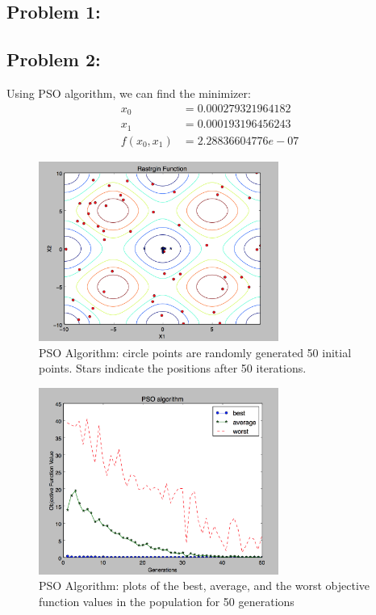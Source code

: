 \documentclass{article}
\begin{document}
 


\subsection*{{Problem 1: }}



\subsection*{{Problem 2: }}

Using PSO algorithm, we can find the minimizer: \\
\begin{align*}
x_0 & = 0.000279321964182 \\
x_1 & = 0.000193196456243 \\
f(x_0,x_1) & =  2.28836604776e-07
\end{align*}

\begin{figure}[h]
\includegraphics[width=0.7\textwidth]{PSO} 
\centering
\caption{PSO Algorithm: circle points are randomly generated 50 initial points. Stars indicate the positions after 50 iterations. }

\end{figure}

\begin{figure}[h]
\includegraphics[width=0.7\textwidth]{PSO_min_best} 
\centering
\caption{PSO Algorithm: plots of the best, average, and the worst objective function values in the population for 50 generations }

\end{figure}
\end{document}
